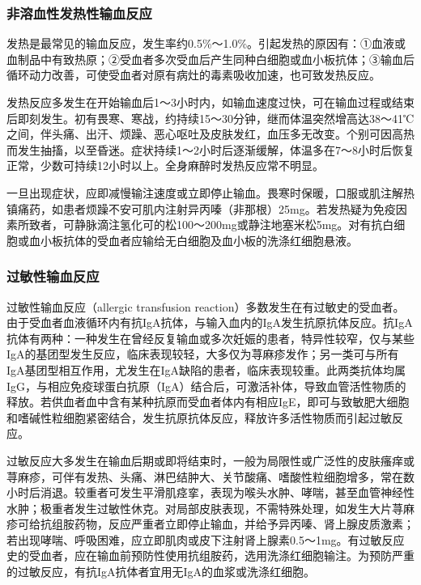 \subsubsection{非溶血性发热性输血反应}

发热是最常见的输血反应，发生率约0.5\%～1.0\%。引起发热的原因有：①血液或血制品中有致热原；②受血者多次受血后产生同种白细胞或血小板抗体；③输血后循环动力改善，可使受血者对原有病灶的毒素吸收加速，也可致发热反应。

发热反应多发生在开始输血后1～3小时内，如输血速度过快，可在输血过程或结束后即刻发生。初有畏寒、寒战，约持续15～30分钟，继而体温突然增高达38～41℃之间，伴头痛、出汗、烦躁、恶心呕吐及皮肤发红，血压多无改变。个别可因高热而发生抽搐，以至昏迷。症状持续1～2小时后逐渐缓解，体温多在7～8小时后恢复正常，少数可持续12小时以上。全身麻醉时发热反应常不明显。

一旦出现症状，应即减慢输注速度或立即停止输血。畏寒时保暖，口服或肌注解热镇痛药，如患者烦躁不安可肌内注射异丙嗪（非那根）25mg。若发热疑为免疫因素所致者，可静脉滴注氢化可的松100～200mg或静注地塞米松5mg。对有抗白细胞或血小板抗体的受血者应输给无白细胞及血小板的洗涤红细胞悬液。

\subsubsection{过敏性输血反应}

过敏性输血反应（allergic transfusion
reaction）多数发生在有过敏史的受血者。由于受血者血液循环内有抗IgA抗体，与输入血内的IgA发生抗原抗体反应。抗IgA抗体有两种：一种发生在曾经反复输血或多次妊娠的患者，特异性较窄，仅与某些IgA的基团型发生反应，临床表现较轻，大多仅为荨麻疹发作；另一类可与所有IgA基团型相互作用，尤发生在IgA缺陷的患者，临床表现较重。此两类抗体均属IgG，与相应免疫球蛋白抗原（IgA）结合后，可激活补体，导致血管活性物质的释放。若供血者血中含有某种抗原而受血者体内有相应IgE，即可与致敏肥大细胞和嗜碱性粒细胞紧密结合，发生抗原抗体反应，释放许多活性物质而引起过敏反应。

过敏反应大多发生在输血后期或即将结束时，一般为局限性或广泛性的皮肤瘙痒或荨麻疹，可伴有发热、头痛、淋巴结肿大、关节酸痛、嗜酸性粒细胞增多，常在数小时后消退。较重者可发生平滑肌痉挛，表现为喉头水肿、哮喘，甚至血管神经性水肿；极重者发生过敏性休克。对局部皮肤表现，不需特殊处理，如发生大片荨麻疹可给抗组胺药物，反应严重者立即停止输血，并给予异丙嗪、肾上腺皮质激素；若出现哮喘、呼吸困难，应立即肌肉或皮下注射肾上腺素0.5～1mg。有过敏反应史的受血者，应在输血前预防性使用抗组胺药，选用洗涤红细胞输注。为预防严重的过敏反应，有抗IgA抗体者宜用无IgA的血浆或洗涤红细胞。

